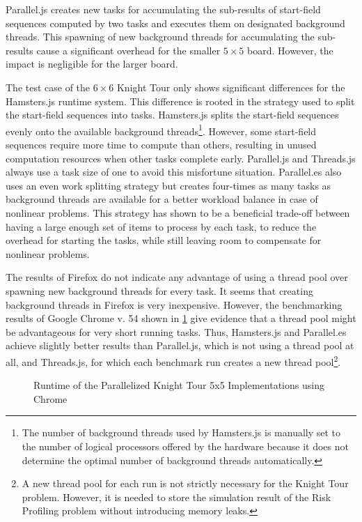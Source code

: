 Parallel.js creates new tasks for accumulating the sub-results of start-field sequences computed by two tasks and executes them on designated background threads. This spawning of new background threads for accumulating the sub-results cause a significant overhead for the smaller $5\times5$ board. However, the impact is negligible for the larger board.

The test case of the $6\times6$ Knight Tour only shows significant differences for the Hamsters.js runtime system. This difference is rooted in the strategy used to split the start-field sequences into tasks. Hamsters.js splits the start-field sequences evenly onto the available background threads\footnote{The number of background threads used by Hamsters.js is manually set to the number of logical processors offered by the hardware because it does not determine the optimal number of background threads automatically.}. However, some start-field sequences require more time to compute than others, resulting in unused computation resources when other tasks complete early. Parallel.js and Threads.js always use a task size of one to avoid this misfortune situation. Parallel.es also uses an even work splitting strategy but creates four-times as many tasks as background threads are available for a better workload balance in case of nonlinear problems. This strategy has shown to be a beneficial trade-off between having a large enough set of items to process by each task, to reduce the overhead for starting the tasks, while still leaving room to compensate for nonlinear problems. 


The results of Firefox do not indicate any advantage of using a thread pool over spawning new background threads for every task. It seems that creating background threads in Firefox is very inexpensive. However, the benchmarking results of Google Chrome v. 54 shown in \cref{fig:runtime-performance-chrome} give evidence that a thread pool might be advantageous for very short running tasks. Thus, Hamsters.js and Parallel.es achieve slightly better results than Parallel.js, which is not using a thread pool at all, and Threads.js, for which each benchmark run creates a new thread pool\footnote{A new thread pool for each run is not strictly necessary for the Knight Tour problem. However, it is needed to store the simulation result of the Risk Profiling problem without introducing memory leaks.}. 

\begin{figure}
	\centering
	
	\caption{Runtime of the Parallelized Knight Tour 5x5 Implementations using Chrome}
	\label{fig:runtime-performance-chrome}
\end{figure}

